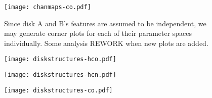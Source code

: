 

\begin{figure}[htp]
  \hspace*{\fill}%
  \texttt{[image: chanmaps-co.pdf]}\hfill%
  \hspace*{\fill}%
  \caption{Since disk A and B's features are assumed to be independent, we may generate corner plots for each of their parameter spaces individually. Some analysis REWORK when new plots are added.}
  \label{fig:co_chanmaps}
\end{figure}






\begin{figure}
  \centering
  \begin{minipage}{.33\textwidth}
    \centering
    \texttt{[image: diskstructures-hco.pdf]}
    \label{fig:disk_str_hco}
  \end{minipage}%
  \begin{minipage}{.33\textwidth}
    \centering
    \texttt{[image: diskstructures-hcn.pdf]}
    \label{fig:disk_str_hcn}
  \end{minipage}%
  \begin{minipage}{.33\textwidth}
    \centering
    \texttt{[image: diskstructures-co.pdf]}
    \label{fig:disk_str_co}
  \end{minipage}%
  \label{fig:noise-profiles}
\end{figure}



